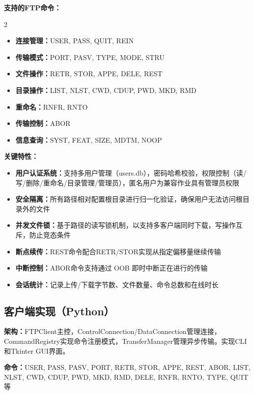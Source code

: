 \documentclass[11pt,a4paper]{article}
\begin{document}
\textbf{支持的FTP命令：}

\begin{multicols}{2}
\begin{itemize}[itemsep=0pt]
    \item \textbf{连接管理：}USER, PASS, QUIT, REIN
    \item \textbf{传输模式：}PORT, PASV, TYPE, MODE, STRU
    \item \textbf{文件操作：}RETR, STOR, APPE, DELE, REST
    \item \textbf{目录操作：}LIST, NLST, CWD, CDUP, PWD, MKD, RMD
    \item \textbf{重命名：}RNFR, RNTO
    \item \textbf{传输控制：}ABOR
    \item \textbf{信息查询：}SYST, FEAT, SIZE, MDTM, NOOP
\end{itemize}
\end{multicols}

\textbf{关键特性：}
\begin{itemize}[itemsep=1pt]
    \item \textbf{用户认证系统：}支持多用户管理（users.db），密码哈希校验，权限控制（读/写/删除/重命名/目录管理/管理员），匿名用户为兼容作业具有管理员权限
    \item \textbf{安全隔离：}所有路径相对配置根目录进行归一化验证，确保用户无法访问根目录外的文件
    \item \textbf{并发文件锁：}基于路径的读写锁机制，以支持多客户端同时下载，写操作互斥，防止竞态条件
    \item \textbf{断点续传：}REST命令配合RETR/STOR实现从指定偏移量继续传输
    \item \textbf{中断控制：}ABOR命令支持通过 OOB 即时中断正在进行的传输
    \item \textbf{会话统计：}记录上传/下载字节数、文件数量、命令总数和在线时长
\end{itemize}

\subsection{客户端实现（Python）}

\textbf{架构：}FTPClient主控，ControlConnection/DataConnection管理连接，CommandRegistry实现命令注册模式，TransferManager管理异步传输。实现CLI和Tkinter GUI界面。

\textbf{命令：}USER, PASS, PASV, PORT, RETR, STOR, APPE, REST, ABOR, LIST, NLST, CWD, CDUP, PWD, MKD, RMD, DELE, RNFR, RNTO, TYPE, QUIT等
\end{document}
